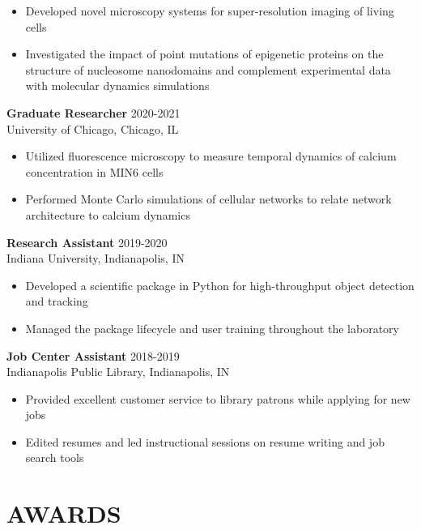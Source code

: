 \documentclass[margin, 10pt]{res} %
\begin{document}
\begin{resume}
\begin{itemize}
\item Developed novel microscopy systems for super-resolution imaging of living cells 

\item Investigated the impact of point mutations of epigenetic proteins on the structure of nucleosome nanodomains and complement experimental data with molecular dynamics simulations


\end{itemize}

\textbf{Graduate Researcher} \hfill 2020-2021 \\
University of Chicago, Chicago, IL

\begin{itemize} \itemsep -2pt %

\item Utilized fluorescence microscopy to measure temporal dynamics of calcium concentration in MIN6 cells

\item Performed Monte Carlo simulations of cellular networks to relate network architecture to calcium dynamics
 
\end{itemize}
 
\textbf{Research Assistant} \hfill 2019-2020\\
Indiana University, Indianapolis, IN
\begin{itemize} \itemsep -2pt

\item Developed a scientific package in Python for high-throughput object detection and tracking
\item Managed the package lifecycle and user training throughout the laboratory
\end{itemize}

\textbf{Job Center Assistant} \hfill 2018-2019\\
Indianapolis Public Library, Indianapolis, IN
\begin{itemize} \itemsep -2pt

\item Provided excellent customer service to library patrons while applying for new jobs
\item Edited resumes and led instructional sessions on resume writing and job search tools
\end{itemize}


\section{AWARDS}


\end{resume}
\end{document}
